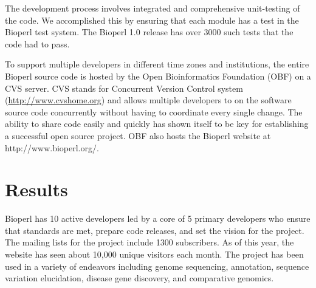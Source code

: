 \documentclass[12pt]{article}
\begin{document}
The development process involves integrated and comprehensive unit-testing
of the code.  We
accomplished this by ensuring that each module has a test in the
Bioperl test system.
The Bioperl 1.0 release has over 3000 such tests that the code had to
pass.

To support multiple developers in different time zones and
institutions, the entire Bioperl source code is hosted by the Open
Bioinformatics Foundation (OBF) \cite{obf-ref} on a CVS server. CVS
stands for Concurrent Version Control system
(\url{http://www.cvshome.org}) \cite{cvsbook} and allows multiple
developers to on the software source code concurrently without having
to coordinate every single change.  The ability to share code easily
and quickly has shown itself to be key for establishing a successful
open source project. OBF also hosts the Bioperl website at
http://www.bioperl.org/.

\section{Results}

Bioperl has 10 active developers led by a core of 5 primary developers
who ensure that standards are met, prepare code releases, and set the
vision for the project.  The mailing lists for the project include
1300 subscribers. As of this year, the website has seen about 10,000
unique visitors each month.  The project has been used in a variety of
endeavors including genome sequencing, annotation, sequence variation
elucidation, disease gene discovery, and comparative genomics.
\end{document}
